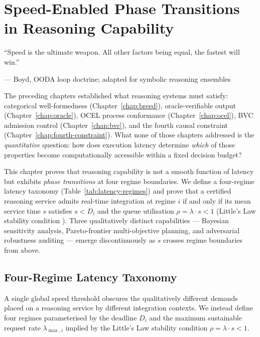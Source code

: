 
\chapter{Speed-Enabled Phase Transitions in Reasoning Capability}
\label{chap:speed}

\epigraph{%
  ``Speed is the ultimate weapon. All other factors being equal, the fastest will win.''
}{--- Boyd, OODA loop doctrine; adapted for symbolic reasoning ensembles}

The preceding chapters established what reasoning systems must satisfy: categorical
well-formedness (Chapter~\ref{chap:breed}), oracle-verifiable output (Chapter~\ref{chap:oracle}),
OCEL process conformance (Chapter~\ref{chap:ocel}), BVC admission control
(Chapter~\ref{chap:bvc}), and the fourth causal constraint (Chapter~\ref{chap:fourth-constraint}).
What none of those chapters addressed is the \emph{quantitative} question: how does
execution latency determine \emph{which} of those properties become computationally
accessible within a fixed decision budget?

This chapter proves that reasoning capability is not a smooth function of latency but
exhibits \emph{phase transitions} at four regime boundaries.  We define a four-regime
latency taxonomy (Table~\ref{tab:latency-regimes}) and prove that a certified reasoning
service admits real-time integration at regime $i$ if and only if its mean service time
$s$ satisfies $s < D_i$ and the queue utilisation $\rho = \lambda \cdot s < 1$ (Little's
Law stability condition \cite{feller1968}).  Three qualitatively distinct capabilities ---
Bayesian sensitivity analysis, Pareto-frontier multi-objective planning, and adversarial
robustness auditing --- emerge discontinuously as $s$ crosses regime boundaries from
above.

\section{Four-Regime Latency Taxonomy}
\label{sec:latency-regimes}

A single global speed threshold obscures the qualitatively different demands placed on a
reasoning service by different integration contexts.  We instead define four regimes
parameterised by the deadline $D_i$ and the maximum sustainable request rate
$\lambda_{\max,i}$ implied by the Little's Law stability condition $\rho = \lambda \cdot
s < 1$.

